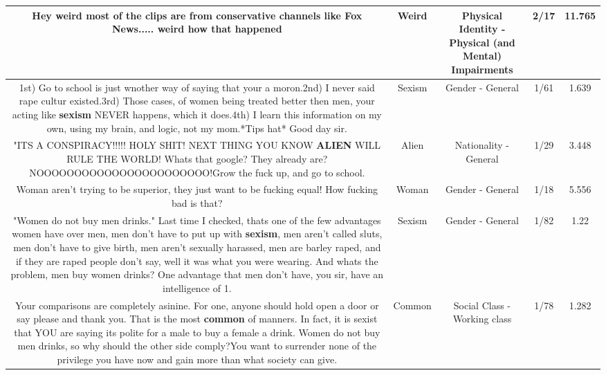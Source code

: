 \documentclass[11pt]{article}
\newlength\mylength
\begin{document}
\begin{center}
\begin{longtable}{|C{.65\mylength}|C{.30\mylength}|C{.12\mylength}|C{.12\mylength}|C{.12\mylength}|}
  \small Hey \textbf{weird} most of the clips are from conservative channels like Fox News..... \textbf{weird} how that happened\normalsize   & Weird & Physical Identity - Physical (and Mental) Impairments & 2/17 & 11.765 \\  \hline
  \small 1st) Go to school is just wnother way of saying that your a moron.2nd) I never said rape cultur existed.3rd) Those cases, of women being treated better then men, your acting like \textbf{sexism} NEVER happens, which it does.4th) I learn this information on my own, using my brain, and logic, not my mom.*Tips hat* Good day sir.\normalsize   & Sexism & Gender - General & 1/61 & 1.639 \\  \hline
  \small "ITS A CONSPIRACY!!!!! HOLY SHIT! NEXT THING YOU KNOW \textbf{ALIEN} WILL RULE THE WORLD! Whats that google? They already are? NOOOOOOOOOOOOOOOOOOOOOOO!Grow the fuck up, and go to school.\normalsize   & Alien & Nationality - General & 1/29 & 3.448 \\  \hline
  \small Woman aren't trying to be superior, they just want to be fucking equal! How fucking bad is that?\normalsize   & Woman & Gender - General & 1/18 & 5.556 \\  \hline
  \small "Women do not buy men drinks." Last time I checked, thats one of the few advantages women have over men, men don't have to put up with \textbf{sexism}, men aren't called sluts, men don't have to give birth, men aren't sexually harassed, men are barley raped, and if they are raped people don't say, well it was what you were wearing. And whats the problem, men buy women drinks? One advantage that men don't have, you sir, have an intelligence of 1.\normalsize   & Sexism & Gender - General & 1/82 & 1.22 \\  \hline
  \small Your comparisons are completely asinine. For one, anyone should hold open a door or say please and thank you. That is the most \textbf{common} of manners. In fact, it is sexist that YOU are saying its polite for a male to buy a female a drink. Women do not buy men drinks, so why should the other side comply?You want to surrender none of the privilege you have now and gain more than what society can give.\normalsize   & Common & Social Class - Working class & 1/78 & 1.282 \\  \hline

\end{longtable}
\end{center}
\end{document}
